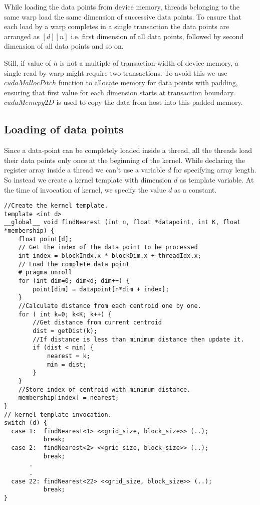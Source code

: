 While loading the data points from device memory, threads belonging to the same  warp load the same dimension of successive data points. To ensure that each load by a warp completes in a single transaction the data points are arranged as $[d][n]$ i.e. first dimension of all data points, followed by second dimension of all data points and so on.

Still, if value of $n$ is not a multiple of transaction-width of device memory, a single read by warp might require two transactions. To avoid this we use $cudaMallocPitch$ function to allocate memory for data points with padding, ensuring that first value for each dimension starts at transaction boundary. $cudaMemcpy2D$ is used to copy the data from host into this padded memory.

\subsection{Loading of data points}
Since a data-point can be completely loaded inside a thread, all the threads load their data points only once at the beginning of the kernel. While declaring the register array inside a thread we can't use a variable $d$ for specifying array length. So instead we create a kernel template with dimension $d$ as template variable. At the time of invocation of kernel, we specify the value $d$ as a constant.

\begin{lstlisting}[morekeywords={blockIndx,blockDim,threadIdx},breaklines=true]
//Create the kernel template.
template <int d>
__global__ void findNearest (int n, float *datapoint, int K, float *membership) {
	float point[d];
	// Get the index of the data point to be processed
	int index = blockIndx.x * blockDim.x + threadIdx.x;
	// Load the complete data point
	# pragma unroll 
	for (int dim=0; dim<d; dim++) {
		point[dim] = datapoint[n*dim + index];
	}
	//Calculate distance from each centroid one by one.
	for ( int k=0; k<K; k++) {
		//Get distance from current centroid
		dist = getDist(k);
		//If distance is less than minimum distance then update it.
		if (dist < min) {
			nearest = k;
			min = dist;
		}
	}
	//Store index of centroid with minimum distance.
	membership[index] = nearest;
}
// kernel template invocation.
switch (d) {
  case 1:  findNearest<1> <<grid_size, block_size>> (..);
           break;
  case 2:  findNearest<2> <<grid_size, block_size>> (..);
           break;
       .
       .
  case 22: findNearest<22> <<grid_size, block_size>> (..);
           break;
}			
\end{lstlisting}


